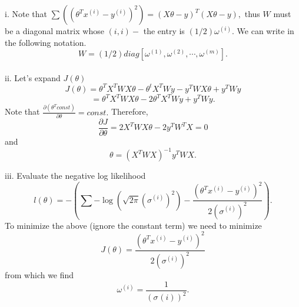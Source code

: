 \begin{answer}

i. Note that $\sum((\theta^Tx^{(i)} - y^{(i)})^2) = (X\theta - y)^T (X\theta - y),$ thus $W$ must be a diagonal matrix whose $(i,i)-$ the entry is $(1/2)\omega^{(i)}.$ We can write in the following notation.
$$W = (1/2)diag[\omega^{(1)}, \omega^{(2)}, \cdots, \omega^{(m)}].$$
\\

ii. Let's expand $J(\theta)$
$$J(\theta) = \theta^TX^TWX\theta - \theta^tX^TWy - y^TWX\theta + y^TWy $$
$$= \theta^TX^TWX\theta - 2\theta^T X^TWy + y^TWy.$$
Note that $\frac{\partial(\theta^T const)}{\partial \theta} = const.$
Therefore,
$$\frac{\partial J}{\partial \theta} = 2X^TWX\theta - 2y^TW^TX= 0$$
and 
$$\theta = (X^T WX)^{-1}y^TWX.$$

iii. Evaluate the negative log likelihood
$$l(\theta) = - (\sum - \log(\sqrt{2\pi} (\sigma^{(i)})^2) - \frac{(\theta^T x^{(i)} - y^{(i)})^2}{2(\sigma^{(i)})^2}). $$
To minimize the above (ignore the constant term) we need to minimize
$$J(\theta) = \frac{(\theta^T x^{(i)} - y^{(i)})^2}{2(\sigma^{(i)})^2}$$
from which we find
$$\omega^{(i)} = \frac{1}{(\sigma^{}(i))^2}.$$
\end{answer}
